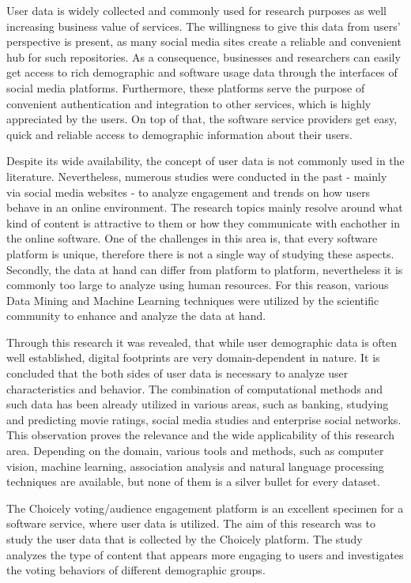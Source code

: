 User data is widely collected and commonly used for research purposes as well increasing business value of services. The willingness to give this data from users' perspective is present, as many social media sites create a reliable and convenient hub for such repositories. As a consequence, businesses and researchers can easily get access to rich demographic and software usage data through the interfaces of social media platforms. Furthermore, these platforms serve the purpose of convenient authentication and integration to other services, which is highly appreciated by the users. On top of that, the software service providers get easy, quick and reliable access to demographic information about their users. 

Despite its wide availability, the concept of user data is not commonly used in the literature. Nevertheless, numerous studies were conducted in the past - mainly via social media websites - to analyze engagement and trends on how users behave in an online environment. The research topics mainly resolve around what kind of content is attractive to them or how they communicate with eachother in the online software. One of the challenges in this area is, that every software platform is unique, therefore there is not a single way of studying these aspects. Secondly, the data at hand can differ from platform to platform, nevertheless it is commonly too large to analyze using human resources. For this reason, various Data Mining and Machine Learning techniques were utilized by the scientific community to enhance and analyze the data at hand. 

Through this research it was revealed, that while user demographic data is often well established, digital footprints are very domain-dependent in nature. It is concluded that the both sides of user data is necessary to analyze user characteristics and behavior. The combination of computational methods and such data has been already utilized in various areas, such as banking, studying and predicting movie ratings, social media studies and enterprise social networks. This observation proves the relevance and the wide applicability of this research area. Depending on the domain, various tools and methods, such as computer vision, machine learning, association analysis and natural language processing techniques are available, but none of them is a silver bullet for every dataset. 

The Choicely voting/audience engagement platform is an excellent specimen for a software service, where user data is utilized. The aim of this research was to study the user data that is collected by the Choicely platform. The study analyzes the type of content that appears more engaging to users and investigates the voting behaviors of different demographic groups. 

